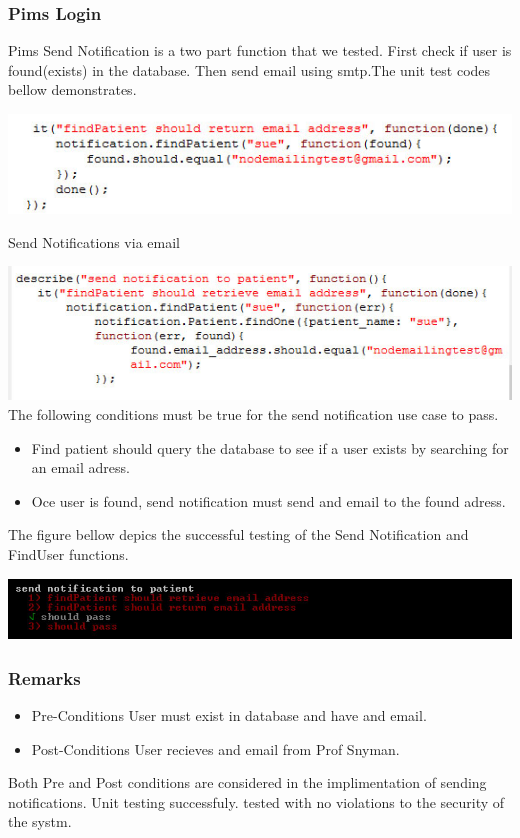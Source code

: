  \subsubsection{Pims Login}
Pims Send Notification is a two part function that we tested. First check if user is found(exists) in the database. Then send email using smtp.The unit test codes bellow demonstrates.
\newline

\includegraphics[width=\linewidth]{./Graphics/find.jpg}
\newline

Send Notifications via email
\newline

\includegraphics[width=\linewidth]{./Graphics/send.jpg}
The following conditions must be true for the send notification use case to pass.					
	\begin{itemize}
				\item Find patient should query the database to see if a user exists by searching for an email adress.
				\item Oce user is found, send notification must send and email to the found adress.
 \end{itemize}
 
 The figure bellow depics the successful testing of the Send Notification and FindUser functions.
 \newline
 
 \includegraphics[width=\linewidth]{./Graphics/Notify.jpg}
 
 \subsubsection{Remarks}
 	\begin{itemize}
 				\item Pre-Conditions
 		User must exist in database and have and email.
 				\item Post-Conditions
	User recieves and email from Prof Snyman.
  \end{itemize}
  
  Both Pre and Post conditions  are considered in the implimentation of sending notifications. Unit testing successfuly.  tested with no violations to the security of the systm.
 
